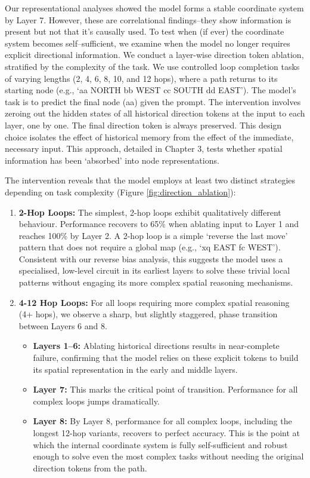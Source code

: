Our representational analyses showed the model forms a stable coordinate system by Layer 7. However, these are correlational findings--they show information is present but not that it's causally used. To test when (if ever) the coordinate system becomes self--sufficient, we examine when the model no longer requires explicit directional information. We conduct a layer-wise direction token ablation, stratified by the complexity of the task. We use controlled loop completion tasks of varying lengths (2, 4, 6, 8, 10, and 12 hops), where a path returns to its starting node (e.g., `aa NORTH bb WEST cc SOUTH dd EAST'). The model's task is to predict the final node (aa) given the prompt. The intervention involves zeroing out the hidden states of all historical direction tokens at the input to each layer, one by one. The final direction token is always preserved. This design choice isolates the effect of historical memory from the effect of the immediate, necessary input. This approach, detailed in Chapter 3, tests whether spatial information has been `absorbed' into node representations.

The intervention reveals that the model employs at least two distinct strategies depending on task complexity (Figure \ref{fig:direction_ablation}):

\begin{enumerate}
\item \textbf{2-Hop Loops:} The simplest, 2-hop loops exhibit qualitatively different behaviour. Performance recovers to 65\% when ablating input to Layer 1 and reaches 100\% by Layer 2. A 2-hop loop is a simple `reverse the last move' pattern that does not require a global map (e.g., `xq EAST fc WEST'). Consistent with our reverse bias analysis, this suggests the model uses a specialised, low-level circuit in its earliest layers to solve these trivial local patterns without engaging its more complex spatial reasoning mechanisms.
\item \textbf{4-12 Hop Loops:} For all loops requiring more complex spatial reasoning (4+ hops), we observe a sharp, but slightly staggered, phase transition between Layers 6 and 8.
\begin{itemize}
    \item \textbf{Layers 1--6:} Ablating historical directions results in near-complete failure, confirming that the model relies on these explicit tokens to build its spatial representation in the early and middle layers.
    \item \textbf{Layer 7:} This marks the critical point of transition. Performance for all complex loops jumps dramatically.
    \item \textbf{Layer 8:} By Layer 8, performance for all complex loops, including the longest 12-hop variants, recovers to perfect accuracy. This is the point at which the internal coordinate system is fully self-sufficient and robust enough to solve even the most complex tasks without needing the original direction tokens from the path.
\end{itemize}
\end{enumerate}

